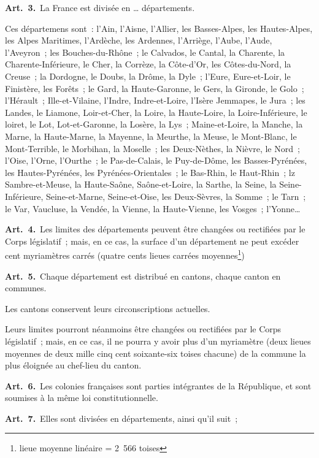 \documentclass[french,twoside]{book} %
\newcommand{\labelchar}[1]{\textbf{\color{rubric} #1}}
\begin{document}
\labelchar{Art. 3.} La France est divisée en … départements.\par
Ces départemens sont : l’Ain, l’Aisne, l’Allier, les Basses-Alpes, les Hautes-Alpes, les Alpes Maritimes, l’Ardèche, les Ardennes, l’Arriège, l’Aube, l’Aude, l’Aveyron ; les Bouches-du-Rhône ; le Calvados, le Cantal, la Charente, la Charente-Inférieure, le Cher, la Corrèze, la Côte-d’Or, les Côtes-du-Nord, la Creuse ; la Dordogne, le Doubs, la Drôme, la Dyle ; l’Eure, Eure-et-Loir, le Finistère, les Forêts ; le Gard, la Haute-Garonne, le Gers, la Gironde, le Golo ; l’Hérault ; Ille-et-Vilaine, l’Indre, Indre-et-Loire, l’Isère Jemmapes, le Jura ; les Landes, le Liamone, Loir-et-Cher, la Loire, la Haute-Loire, la Loire-Inférieure, le loiret, le Lot, Lot-et-Garonne, la Losère, la Lys ; Maine-et-Loire, la Manche, la Marne, la Haute-Marne, la Mayenne, la Meurthe, la Meuse, le Mont-Blanc, le Mont-Terrible, le Morbihan, la Moselle ; les Deux-Nèthes, la Nièvre, le Nord ; l’Oise, l’Orne, l’Ourthe ; le Pas-de-Calais, le Puy-de-Dôme, les Basses-Pyrénées, les Hautes-Pyrénées, les Pyrénées-Orientales ; le Bas-Rhin, le Haut-Rhin ; lz Sambre-et-Meuse, la Haute-Saône, Saône-et-Loire, la Sarthe, la Seine, la Seine-Inférieure, Seine-et-Marne, Seine-et-Oise, les Deux-Sèvres, la Somme ; le Tarn ; le Var, Vaucluse, la Vendée, la Vienne, la Haute-Vienne, les Vosges ; l’Yonne…\par
\labelchar{Art. 4.} Les limites des départements peuvent être changées ou rectifiées par le Corps législatif ; mais, en ce cas, la surface d’un département ne peut excéder cent myriamètres carrés (quatre cents lieues carrées moyennes\footnote{lieue moyenne linéaire = 2 566 toises})\par
\labelchar{Art. 5.} Chaque département est distribué en cantons, chaque canton en communes.\par
Les cantons conservent leurs circonscriptions actuelles.\par
Leurs limites pourront néanmoins être changées ou rectifiées par le Corps législatif ; mais, en ce cas, il ne pourra y avoir plus d’un myriamètre (deux lieues moyennes de deux mille cinq cent soixante-six toises chacune) de la commune la plus éloignée au chef-lieu du canton.\par
\labelchar{Art. 6.} Les colonies françaises sont parties intégrantes de la République, et sont soumises à la même loi constitutionnelle.\par
\labelchar{Art. 7.} Elles sont divisées en départements, ainsi qu’il suit ;\par
\end{document}
